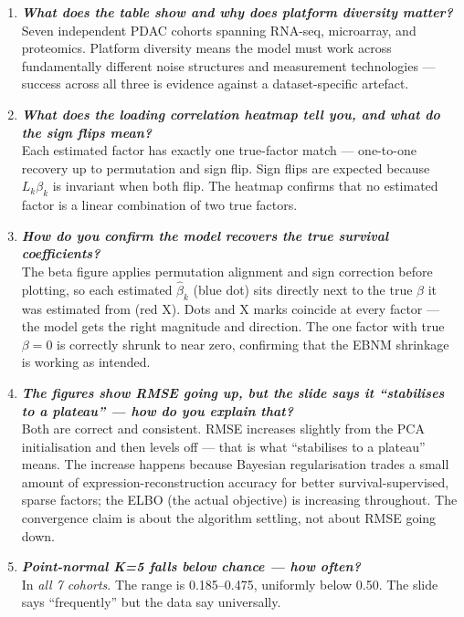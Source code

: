 \documentclass[11pt]{article}
\newcommand{\actioncue}[1]{\textit{\textbf{#1}}}
\begin{document}
\begin{enumerate}

\item[\textbf{S10}] \actioncue{What does the table show and why does platform diversity matter?}\\
Seven independent PDAC cohorts spanning RNA-seq, microarray, and proteomics. Platform diversity means the model must work across fundamentally different noise structures and measurement technologies --- success across all three is evidence against a dataset-specific artefact.

\item[\textbf{S11L}] \actioncue{What does the loading correlation heatmap tell you, and what do the sign flips mean?}\\
Each estimated factor has exactly one true-factor match --- one-to-one recovery up to permutation and sign flip. Sign flips are expected because $L_k \beta_k$ is invariant when both flip. The heatmap confirms that no estimated factor is a linear combination of two true factors.

\item[\textbf{S11R}] \actioncue{How do you confirm the model recovers the true survival coefficients?}\\
The beta figure applies permutation alignment and sign correction before plotting, so each estimated $\hat{\beta}_k$ (blue dot) sits directly next to the true $\beta$ it was estimated from (red X). Dots and X marks coincide at every factor --- the model gets the right magnitude and direction. The one factor with true $\beta = 0$ is correctly shrunk to near zero, confirming that the EBNM shrinkage is working as intended.

\item[\textbf{S12}] \actioncue{The figures show RMSE going up, but the slide says it ``stabilises to a plateau'' --- how do you explain that?}\\
Both are correct and consistent. RMSE increases slightly from the PCA initialisation and then levels off --- that is what ``stabilises to a plateau'' means. The increase happens because Bayesian regularisation trades a small amount of expression-reconstruction accuracy for better survival-supervised, sparse factors; the ELBO (the actual objective) is increasing throughout. The convergence claim is about the algorithm settling, not about RMSE going down.

\item[\textbf{S13}] \actioncue{Point-normal K=5 falls below chance --- how often?}\\
In \emph{all 7 cohorts}. The range is 0.185--0.475, uniformly below 0.50. The slide says ``frequently'' but the data say universally.


\end{enumerate}
\end{document}
